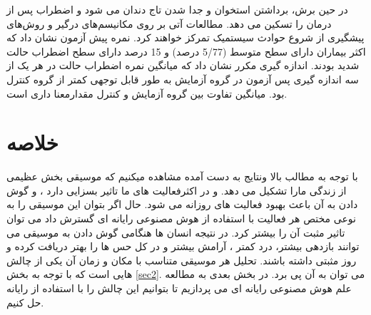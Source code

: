  در حین برش، برداشتن استخوان و جدا شدن تاج دندان می شود و اضطراب پس از درمان را تسکین می دهد.  مطالعات آتی بر روی مکانیسم‌های درگیر و روش‌های پیشگیری از شروع حوادث سیستمیک تمرکز خواهند کرد.
نمره پیش آزمون نشان داد که اکثر بیماران دارای سطح متوسط ​​(5/77 درصد) و 15 درصد دارای سطح اضطراب حالت شدید بودند. اندازه گیری مکرر نشان داد که میانگین نمره اضطراب حالت در هر یک از سه اندازه گیری پس آزمون در گروه آزمایش به طور قابل توجهی کمتر از گروه کنترل بود.  میانگین تفاوت بین گروه آزمایش و کنترل مقدار‌معنا داری است.
\cite{li2012effects,yamashita2019effects,pothoulaki2008investigation}
\section{خلاصه}
با توجه به مطالب بالا ونتایج به دست آمده مشاهده میکنیم که موسیقی بخش عظیمی از زندگی مارا تشکیل می دهد.  و در اکثرفعالیت های ما تاثیر بسزایی دارد ، و گوش دادن به آن باعث بهبود فعالیت های روزانه می شود. 
حال اگر بتوان این موسیقی را به نوعی مختص هر فعالیت با استفاده از هوش مصنوعی رایانه ای گسترش داد می توان تاثیر مثبت آن را بیشتر کرد. در نتیجه انسان ها هنگامی گوش دادن به موسیقی می توانند بازدهی بیشتر، درد کمتر ، آرامش بیشتر و در کل حس ها را بهتر دریافت کرده و روز مثبتی داشته باشند. 
تحلیل هر موسیقی متناسب با مکان و زمان آن یکی از چالش هایی است که با توجه به بخش 
\ref{sec2}.
می توان به آن پی برد. در بخش بعدی به مطالعه علم هوش مصنوعی رایانه ای می پردازیم تا بتوانیم این چالش را با استفاده از رایانه حل کنیم.
